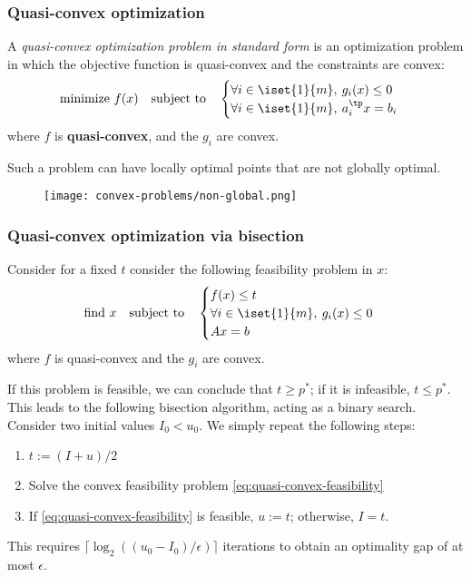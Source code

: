 \subsubsection{Quasi-convex optimization}
\begin{definition}
    A \emph{quasi-convex optimization problem in standard form} is an optimization problem in which the objective function is quasi-convex and the constraints are convex:
    \begin{equation*}
        \text{minimize } f(x) \quad\text{subject to}\quad \begin{cases}
            \forall i\in\iset{1}{m}, \: g_i(x)\leq 0\\
            \forall i\in\iset{1}{m}, \: a_i^\tp x = b_i
        \end{cases}
    \end{equation*}
    where $f$ is \textbf{quasi-convex}, and the $g_i$ are convex.
\end{definition}

\begin{remark}
    Such a problem can have locally optimal points that are not globally optimal.
    \begin{figure}[H]
        \centering
        \texttt{[image: convex-problems/non-global.png]}
    \end{figure}
\end{remark}

\subsubsection{Quasi-convex optimization via bisection}
Consider for a fixed $t$ consider the following feasibility problem in $x$:
\begin{equation}
    \label{eq:quasi-convex-feasibility}
    \text{find } x \quad\text{subject to}\quad \begin{cases}
        f(x)\leq t\\
        \forall i\in\iset{1}{m}, \: g_i(x)\leq 0\\
        Ax=b
    \end{cases}
\end{equation}
where $f$ is quasi-convex and the $g_i$ are convex.

If this problem is feasible, we can conclude that $t\geq p^*$; if it is infeasible, $t\leq p^*$. This leads to the following bisection algorithm, acting as a binary search. Consider two initial values $I_0<u_0$. We simply repeat the following steps:
\begin{enumerate}
    \item $t:=(I+u)/2$
    \item Solve the convex feasibility problem \eqref{eq:quasi-convex-feasibility}
    \item If \eqref{eq:quasi-convex-feasibility} is feasible, $u:=t$; otherwise, $I=t$.
\end{enumerate}
This requires $\lceil \log_2((u_0-I_0)/\epsilon)\rceil$ iterations to obtain an optimality gap of at most $\epsilon$.

